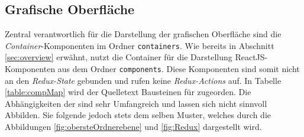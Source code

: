 \subsection{Grafische Oberfläche}

Zentral verantwortlich für die Darstellung der grafischen Oberfläche sind die \emph{Container}-Komponenten im Ordner \lstinline|containers|. Wie bereits in  Abschnitt \ref{sec:overview} erwähnt, nutzt die Container für die Darstellung ReactJS-Komponenten aus dem Ordner \lstinline|components|.
Diese Komponenten sind somit nicht an den \emph{Redux-State} gebunden und rufen keine \emph{Redux-Actions} auf.
In Tabelle \ref{table:compMap} wird der Quelletext Bausteinen für zugeorden. Die Abhängigkeiten der sind sehr Umfangreich und lassen sich nicht sinnvoll Abbilden. Sie
folgende jedoch stets dem selben Muster, welches durch die Abbildungen \ref{fig:obersteOrdnerebene} und \ref{fig:Redux} dargestellt wird.

